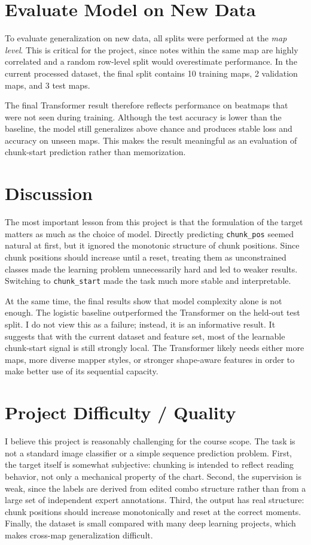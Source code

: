 \documentclass[final]{article}
\begin{document}
\section*{Evaluate Model on New Data}
To evaluate generalization on new data, all splits were performed at the \emph{map level}. This is critical for the project, since notes within the same map are highly correlated and a random row-level split would overestimate performance. In the current processed dataset, the final split contains 10 training maps, 2 validation maps, and 3 test maps.

The final Transformer result therefore reflects performance on beatmaps that were not seen during training. Although the test accuracy is lower than the baseline, the model still generalizes above chance and produces stable loss and accuracy on unseen maps. This makes the result meaningful as an evaluation of chunk-start prediction rather than memorization.

\section*{Discussion}
The most important lesson from this project is that the formulation of the target matters as much as the choice of model. Directly predicting \texttt{chunk\_pos} seemed natural at first, but it ignored the monotonic structure of chunk positions. Since chunk positions should increase until a reset, treating them as unconstrained classes made the learning problem unnecessarily hard and led to weaker results. Switching to \texttt{chunk\_start} made the task much more stable and interpretable.

At the same time, the final results show that model complexity alone is not enough. The logistic baseline outperformed the Transformer on the held-out test split. I do not view this as a failure; instead, it is an informative result. It suggests that with the current dataset and feature set, most of the learnable chunk-start signal is still strongly local. The Transformer likely needs either more maps, more diverse mapper styles, or stronger shape-aware features in order to make better use of its sequential capacity.

\section*{Project Difficulty / Quality}
I believe this project is reasonably challenging for the course scope. The task is not a standard image classifier or a simple sequence prediction problem. First, the target itself is somewhat subjective: chunking is intended to reflect reading behavior, not only a mechanical property of the chart. Second, the supervision is weak, since the labels are derived from edited combo structure rather than from a large set of independent expert annotations. Third, the output has real structure: chunk positions should increase monotonically and reset at the correct moments. Finally, the dataset is small compared with many deep learning projects, which makes cross-map generalization difficult.
\end{document}
